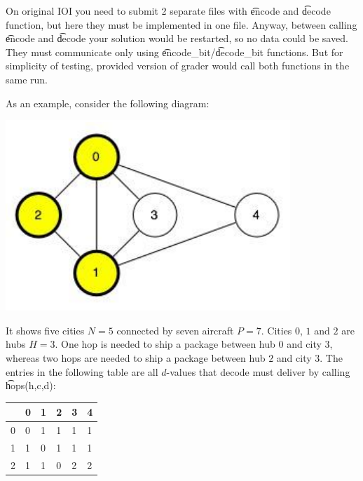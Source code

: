On original IOI you need to submit 2 separate files with \t{encode} and \t{decode} function, but here they must be implemented in one file. Anyway, between calling \t{encode} and \t{decode} your solution would be restarted, so no data could be saved. They must communicate only using \t{encode\_bit}/\t{decode\_bit} functions. But for simplicity of testing, provided version of grader would call both functions in the same run. 


As an example, consider the following diagram:

\includegraphics{SaveitSample.png}

It shows five cities $N=5$ connected by seven aircraft $P=7$. Cities $0$, $1$ and $2$ are hubs $H=3$. One hop is needed to ship a package between hub $0$ and city $3$, whereas two hops are needed to ship a package between hub $2$ and city $3$. The entries in the following table are all $d$-values that decode must deliver by calling \t{hops(h,c,d)}:

\begin{tabular}{|l|l|l|l|l|l|}
\hline
  & 0 & 1 & 2 & 3 & 4 \\ \hline
0 & 0 & 1 & 1 & 1 & 1 \\ \hline
1 & 1 & 0 & 1 & 1 & 1 \\ \hline
2 & 1 & 1 & 0 & 2 & 2 \\ \hline
\end{tabular}

